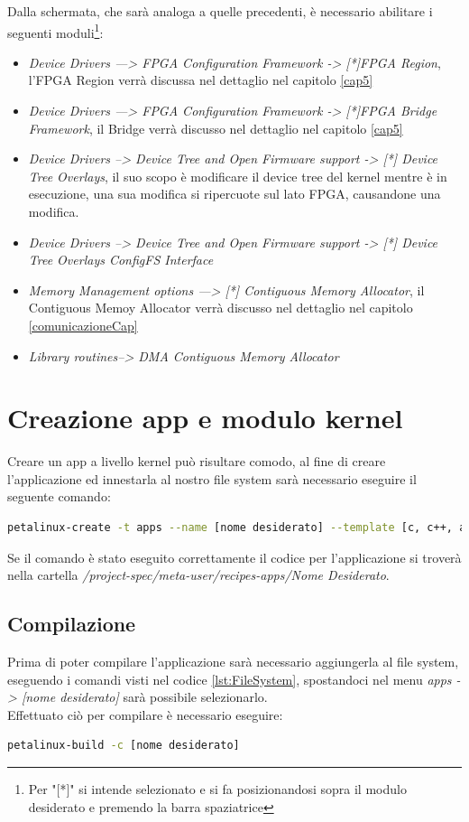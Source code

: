 Dalla schermata, che sarà analoga a quelle precedenti, è necessario abilitare i seguenti moduli\footnote{Per "[*]" si intende selezionato e si fa posizionandosi sopra il modulo desiderato e premendo la barra spaziatrice}:
\begin{itemize}
    \item \textit{Device Drivers ---> FPGA Configuration Framework -> [*]FPGA Region}, l'FPGA Region verrà discussa nel dettaglio nel capitolo \ref{cap5}
    \item \textit{Device Drivers ---> FPGA Configuration Framework -> [*]FPGA Bridge Framework}, il Bridge verrà discusso nel dettaglio nel capitolo \ref{cap5}
    \item \textit{Device Drivers --> Device Tree and Open Firmware support -> [*] Device Tree Overlays}, il suo scopo è modificare il device tree del kernel mentre è in esecuzione, una sua modifica si ripercuote sul lato FPGA, causandone una modifica.
    \item \textit{Device Drivers --> Device Tree and Open Firmware support -> [*] Device Tree Overlays ConfigFS Interface}
    \item \textit{Memory Management options ---> [*] Contiguous Memory Allocator}, il Contiguous Memoy Allocator verrà discusso nel dettaglio nel capitolo \ref{comunicazioneCap}
    \item \textit{Library routines--> DMA Contiguous Memory Allocator }
\end{itemize}

\section{Creazione app e modulo kernel}
Creare un app a livello kernel può risultare comodo, al fine di creare l'applicazione ed innestarla al nostro file system sarà necessario eseguire il seguente comando:
\begin{lstlisting}[language=sh, label=lst:creazioneApp, caption={Comando necessario alla creazione dell'applicazione, va eseguito nella cartella del progetto}]
petalinux-create -t apps --name [nome desiderato] --template [c, c++, autoconf, install]
\end{lstlisting}
Se il comando è stato eseguito correttamente il codice per l'applicazione si troverà nella cartella 
\textit{/project-spec/meta-user/recipes-apps/Nome Desiderato}.
\subsection{Compilazione}
Prima di poter compilare l'applicazione sarà necessario aggiungerla al file system, eseguendo i comandi visti nel codice \ref{lst:FileSystem}, spostandoci nel menu \textit{apps -> [nome desiderato]} sarà possibile selezionarlo.\\
Effettuato ciò per compilare è necessario eseguire:
\begin{lstlisting}[language=sh, label=lst:sh, caption={Comando necessario alla compilazione dell'applicazione}]
petalinux-build -c [nome desiderato]
\end{lstlisting}
